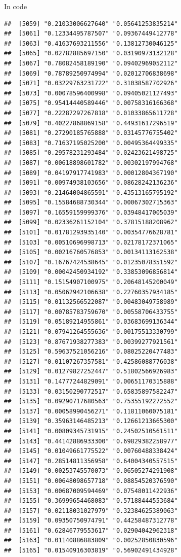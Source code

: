 \documentclass[ignorenonframetext,]{beamer}
\begin{document}
\begin{frame}[fragile]{In code}
\begin{verbatim}
##  [5059] "0.21033006627640" "0.05641253835214"
##  [5061] "0.12334495787507" "0.09367449412778"
##  [5063] "0.41637693211556" "0.13812730046125"
##  [5065] "0.02782885697150" "0.03190973132128"
##  [5067] "0.78082458189190" "0.09402969052112"
##  [5069] "0.78789250974994" "0.02012706838698"
##  [5071] "0.03229763231722" "0.31038587702926"
##  [5073] "0.00078596400998" "0.09405021127493"
##  [5075] "0.95414440589446" "0.00758316166368"
##  [5077] "0.22287297267818" "0.01033865611728"
##  [5079] "0.40227868869158" "0.44931617296519"
##  [5081] "0.27290185765888" "0.03145776755402"
##  [5083] "0.71637195025200" "0.00495364499335"
##  [5085] "0.29578231293484" "0.02423621498725"
##  [5087] "0.00618898601782" "0.00302197994768"
##  [5089] "0.04197917741983" "0.00012804367190"
##  [5091] "0.00974938103656" "0.08628242136236"
##  [5093] "0.21464004865591" "0.43513165795192"
##  [5095] "0.15584688730344" "0.00067302715363"
##  [5097] "0.16559159999376" "0.03948417005039"
##  [5099] "0.02336261152104" "0.37815188208962"
##  [5101] "0.01781293935140" "0.00354776628781"
##  [5103] "0.00510696998713" "0.02178172371065"
##  [5105] "0.00216760576853" "0.00134113162538"
##  [5107] "0.16767424538645" "0.01235078351592"
##  [5109] "0.00042450934192" "0.33853096856814"
##  [5111] "0.15154907100975" "0.20648145200049"
##  [5113] "0.05062942106638" "0.22760357934185"
##  [5115] "0.01132566522087" "0.00483049758989"
##  [5117] "0.00785783759670" "0.00558706433755"
##  [5119] "0.05189214955861" "0.03683699136344"
##  [5121] "0.07941264555636" "0.00175513330799"
##  [5123] "0.87671938277383" "0.00399277921561"
##  [5125] "0.59637521056216" "0.08025220477483"
##  [5127] "0.01107267357581" "0.42586088776038"
##  [5129] "0.01279827252447" "0.51802566926983"
##  [5131] "0.14777244829091" "0.00651170315888"
##  [5133] "0.03150290772517" "0.65835897582247"
##  [5135] "0.09290717680563" "0.75355192272552"
##  [5137] "0.00058990456271" "0.11811060075181"
##  [5139] "0.35963146485213" "0.12661213665300"
##  [5141] "0.00809345731915" "0.24502510561511"
##  [5143] "0.44142886933300" "0.69829382258977"
##  [5145] "0.01049661775522" "0.00760488338424"
##  [5147] "0.28514811356958" "0.64004340557515"
##  [5149] "0.00253745570073" "0.06505274291908"
##  [5151] "0.00648098657718" "0.08854520376590"
##  [5153] "0.00687009594469" "0.07548011422936"
##  [5155] "0.36999654468083" "0.57188444553684"
##  [5157] "0.02118031027979" "0.32384625389063"
##  [5159] "0.09350750974791" "0.44258487312778"
##  [5161] "0.62846779553617" "0.02904042962318"
##  [5163] "0.01140886883809" "0.00252850830596"
##  [5165] "0.01540916303819" "0.56902491434928"

\end{verbatim}
\end{frame}
\end{document}
